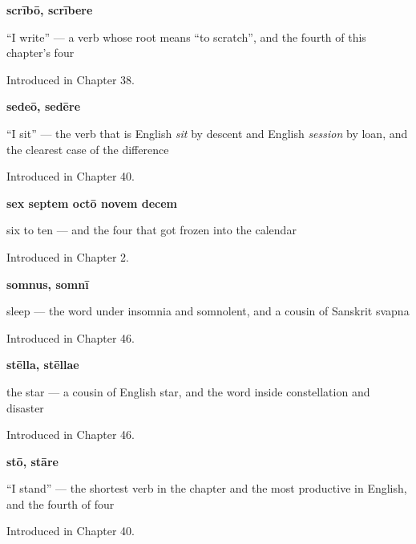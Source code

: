 \noindent\begin{minipage}[t]{\linewidth}
\raggedright
\textbf{scrībō, scrībere}\par
\small \textquotedblleft{}I write\textquotedblright{} — a verb whose root means \textquotedblleft{}to scratch\textquotedblright{}, and the fourth of this chapter's four\par
\footnotesize Introduced in Chapter 38.
\end{minipage}\par\medskip

\noindent\begin{minipage}[t]{\linewidth}
\raggedright
\textbf{sedeō, sedēre}\par
\small \textquotedblleft{}I sit\textquotedblright{} — the verb that is English \emph{sit} by descent and English \emph{session} by loan, and the clearest case of the difference\par
\footnotesize Introduced in Chapter 40.
\end{minipage}\par\medskip

\noindent\begin{minipage}[t]{\linewidth}
\raggedright
\textbf{sex septem octō novem decem}\par
\small six to ten — and the four that got frozen into the calendar\par
\footnotesize Introduced in Chapter 2.
\end{minipage}\par\medskip

\noindent\begin{minipage}[t]{\linewidth}
\raggedright
\textbf{somnus, somnī}\par
\small sleep — the word under insomnia and somnolent, and a cousin of Sanskrit svapna\par
\footnotesize Introduced in Chapter 46.
\end{minipage}\par\medskip

\noindent\begin{minipage}[t]{\linewidth}
\raggedright
\textbf{stēlla, stēllae}\par
\small the star — a cousin of English star, and the word inside constellation and disaster\par
\footnotesize Introduced in Chapter 46.
\end{minipage}\par\medskip

\noindent\begin{minipage}[t]{\linewidth}
\raggedright
\textbf{stō, stāre}\par
\small \textquotedblleft{}I stand\textquotedblright{} — the shortest verb in the chapter and the most productive in English, and the fourth of four\par
\footnotesize Introduced in Chapter 40.
\end{minipage}\par\medskip

